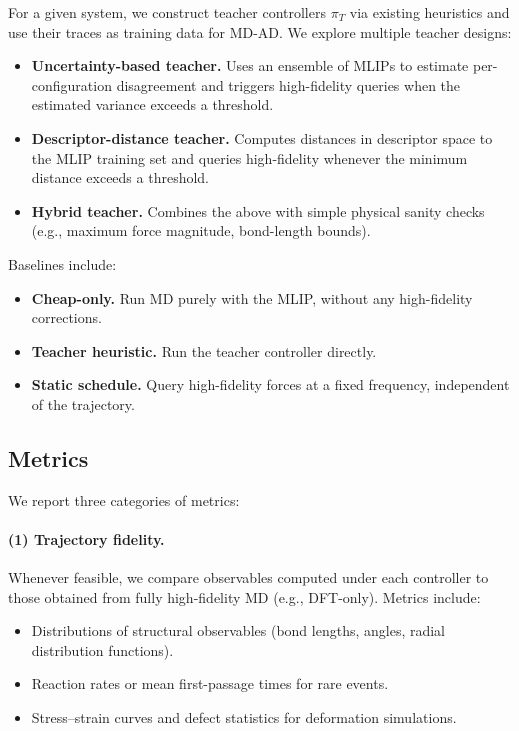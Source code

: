 \documentclass{article}
\begin{document}
For a given system, we construct teacher controllers $\pi_T$ via existing heuristics and use their traces as training data for MD-AD. We explore multiple teacher designs:
\begin{itemize}
    \item \textbf{Uncertainty-based teacher.} Uses an ensemble of MLIPs to estimate per-configuration disagreement and triggers high-fidelity queries when the estimated variance exceeds a threshold.
    \item \textbf{Descriptor-distance teacher.} Computes distances in descriptor space to the MLIP training set and queries high-fidelity whenever the minimum distance exceeds a threshold.
    \item \textbf{Hybrid teacher.} Combines the above with simple physical sanity checks (e.g., maximum force magnitude, bond-length bounds).
\end{itemize}

Baselines include:
\begin{itemize}
    \item \textbf{Cheap-only.} Run MD purely with the MLIP, without any high-fidelity corrections.
    \item \textbf{Teacher heuristic.} Run the teacher controller directly.
    \item \textbf{Static schedule.} Query high-fidelity forces at a fixed frequency, independent of the trajectory.
\end{itemize}

\subsection{Metrics}

We report three categories of metrics:

\paragraph{(1) Trajectory fidelity.} 
Whenever feasible, we compare observables computed under each controller to those obtained from fully high-fidelity MD (e.g., DFT-only). Metrics include:
\begin{itemize}
    \item Distributions of structural observables (bond lengths, angles, radial distribution functions).
    \item Reaction rates or mean first-passage times for rare events.
    \item Stress--strain curves and defect statistics for deformation simulations.
\end{itemize}
\end{document}
